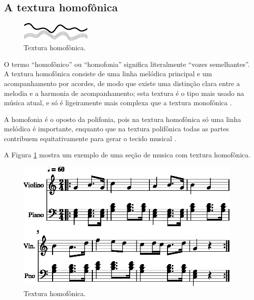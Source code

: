 \subsection{A textura homofônica}
\label{subsec:homofonica}
\begin{figure}
  \centering
    \includegraphics[width=0.31\textwidth]{chapters/cap-musicalidade-percepcion/honofonica1.eps}
  \caption{Textura homofônica.}
\end{figure}
O termo ``homofônico'' ou ``homofonia'' significa literalmente ``vozes semelhantes''.%
A textura homofônica consiste de uma linha melódica principal e um acompanhamento por acordes,
de modo que existe uma distinção clara entre a melodia e a harmonia de acompanhamento;
esta textura é o tipo  mais usado na música atual,
e só é ligeiramente mais complexa que a textura monofônica 
\cite[pp. 78]{copland1974ouvir} \cite[pp. 29]{kerman2015listen} 
\cite[pp. 43]{bennett1993elementos} \cite[pp. 58]{holland2013music}.


A homofonia é o oposto da polifonia, 
pois na textura homofônica só uma linha melódica é importante,
enquanto que na textura polifônica todas as partes contribuem equitativamente para gerar o tecido musical
\cite[pp. 687]{apel1969harvard}.

\begin{example}
A Figura \ref{fig:ex:homofonica} mostra um exemplo de uma seção de musica com textura homofônica.
\end{example}

\begin{figure}[!h]
\centering
    \includegraphics[width=0.99\textwidth]{chapters/cap-musicalidade-percepcion/textura-homofonica-1.eps}
  \caption{Textura homofônica.}
\label{fig:ex:homofonica}
\end{figure}


